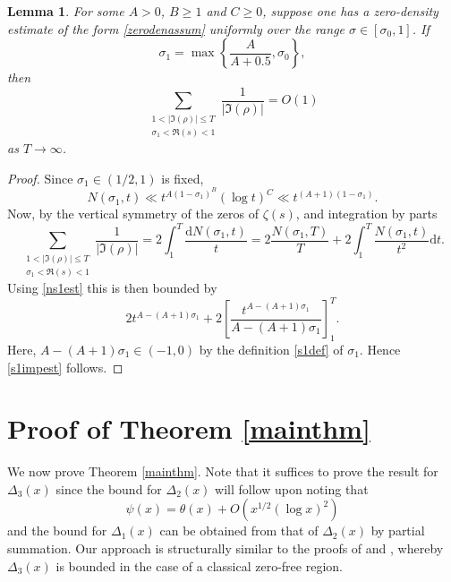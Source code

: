 \documentclass[reqno]{amsart}
\newtheorem{lemma}[theorem]{Lemma}
\numberwithin{equation}{section}
\theoremstyle{remark}
\begin{document}
\begin{lemma}\label{Implem2}
    For some $A>0$, $B\geq 1$ and $C\geq 0$, suppose one has a zero-density estimate of the form \eqref{zerodenassum} uniformly over the range $\sigma\in[\sigma_0,1]$. If
    \begin{equation}\label{s1def}
        \sigma_1=\max\left\{\frac{A}{A+0.5},\sigma_0\right\},    
    \end{equation}
    then
    \begin{equation}\label{s1impest}
         \sum_{\substack{1<|\Im(\rho)|\leq T\\\sigma_1<\Re(s)<1}}\frac{1}{|\Im(\rho)|}= O(1)
    \end{equation}
    as $T\to\infty$.
\end{lemma}
\begin{proof}
    Since $\sigma_1\in (1/2,1)$ is fixed,
    \begin{equation}\label{ns1est}
        N(\sigma_1,t)\ll t^{A(1-\sigma_1)^B}(\log t)^C\ll t^{(A+1)(1-\sigma_1)}. 
    \end{equation}
    Now, by the vertical symmetry of the zeros of $\zeta(s)$, and integration by parts
    \begin{equation*}
        \sum_{\substack{1<|\Im(\rho)|\leq T\\\sigma_1<\Re(s)<1}}\frac{1}{|\Im(\rho)|}=2\int_1^T\frac{\mathrm{d}N(\sigma_1,t)}{t}=2\frac{N(\sigma_1,T)}{T}+2\int_1^T\frac{N(\sigma_1,t)}{t^2}\mathrm{d}t.
    \end{equation*}
    Using \eqref{ns1est} this is then bounded by
    \begin{equation*}
        2t^{A-(A+1)\sigma_1}+2\left[\frac{t^{A-(A+1)\sigma_1}}{A-(A+1)\sigma_1}\right]_1^T.
    \end{equation*}
    Here, $A-(A+1)\sigma_1\in(-1,0)$ by the definition \eqref{s1def} of $\sigma_1$. Hence \eqref{s1impest} follows. 
\end{proof}

\section{Proof of Theorem \ref{mainthm}}\label{mainsect}
We now prove Theorem \ref{mainthm}. Note that it suffices to prove the result for $\Delta_3(x)$ since the bound for $\Delta_2(x)$ will follow upon noting that \cite[Theorem 413]{hardy2008introduction}
\begin{equation*}
    \psi(x)=\theta(x)+O\left(x^{1/2}(\log x)^2\right)    
\end{equation*}
and the bound for $\Delta_1(x)$ can be obtained from that of $\Delta_2(x)$ by partial summation.
Our approach is structurally similar to the proofs of \cite[Theorem 1]{platt2021error} and \cite[Theorem 1.2]{fiori2023sharpera}, whereby $\Delta_3(x)$ is bounded in the case of a classical zero-free region.
\end{document}
